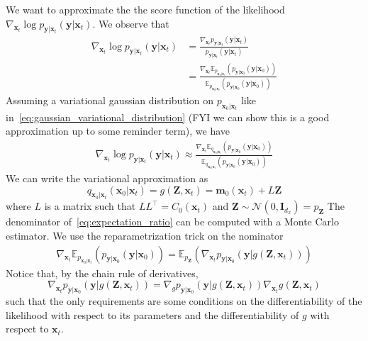 We want to approximate the the score function of the likelihood $\nabla_{\mathbf{x}_t} \log p_{\mathbf{y}|\mathbf{x}_t}(\mathbf{y}|\mathbf{x}_t)$. We observe that
\begin{align}
    \nabla_{\mathbf{x}_t } \log p_{\mathbf{y}|\mathbf{x}_t}(\mathbf{y}|\mathbf{x}_t) &= \frac{\nabla_{\mathbf{x}_t } p_{\mathbf{y}|\mathbf{x}_t}(\mathbf{y}|\mathbf{x}_t)}{p_{\mathbf{y}|\mathbf{x}_t}(\mathbf{y}|\mathbf{x}_t)}\\
    &= \frac{\nabla_{\mathbf{x}_t } \mathbb{E}_{p_{\mathbf{x}_0|\mathbf{x}_t}}(p_{\mathbf{y}|\mathbf{x}_0}(\mathbf{y}|\mathbf{x}_0))}{\mathbb{E}_{p_{\mathbf{x}_0|\mathbf{x}_t}}(p_{\mathbf{y}|\mathbf{x}_0}(\mathbf{y}|\mathbf{x}_0))}
\end{align}
Assuming a variational gaussian distribution on $p_{\mathbf{x}_0|\mathbf{x}_t}$ like in~\eqref{eq:gaussian_variational_distribution} (FYI we can show this is a good approximation up to some reminder term), we have 
\begin{align}
    \nabla_{\mathbf{x}_t } \log p_{\mathbf{y}|\mathbf{x}_t}(\mathbf{y}|\mathbf{x}_t) \approx \frac{\nabla_{\mathbf{x}_t } \mathbb{E}_{q_{\mathbf{x}_0|\mathbf{x}_t}}(p_{\mathbf{y}|\mathbf{x}_0}(\mathbf{y}|\mathbf{x}_0))}{\mathbb{E}_{q_{\mathbf{x}_0|\mathbf{x}_t}}(p_{\mathbf{y}|\mathbf{x}_0}(\mathbf{y}|\mathbf{x}_0))}\label{eq:expectation_ratio}
\end{align}
We can write the variational approximation as
\begin{equation}
    q_{\mathbf{x}_0|\mathbf{x}_t}(\mathbf{x}_0|\mathbf{x}_t) = g(\mathbf{Z}, \mathbf{x}_t) = \mathbf{m}_0(\mathbf{x}_t) + L\mathbf{Z} 
\end{equation}
where $L$ is a matrix such that $LL^\top = C_0(\mathbf{x}_t)$ and $\mathbf{Z} \sim \mathcal{N}(0, \mathbf{I}_{d_x}) = p_{\mathbf{Z}}$
The denominator of~\eqref{eq:expectation_ratio} can be computed with a Monte Carlo estimator. We use the reparametrization trick on the nominator
\begin{align}
     \nabla_{\mathbf{x}_t } \mathbb{E}_{p_{\mathbf{x}_0|\mathbf{x}_t}}(p_{\mathbf{y}|\mathbf{x}_0}(\mathbf{y}|\mathbf{x}_0)) = \mathbb{E}_{p_{\mathbf{Z}}}(\nabla_{\mathbf{x}_t }p_{\mathbf{y}| \mathbf{x}_0 }(\mathbf{y}|g(\mathbf{Z}, \mathbf{x}_t))) 
\end{align}
Notice that, by the chain rule of derivatives,
\begin{equation}
\nabla_{\mathbf{x}_t }p_{\mathbf{y}| \mathbf{x}_0 }(\mathbf{y}|g(\mathbf{Z}, \mathbf{x}_t)) = \nabla_{g}p_{\mathbf{y}| \mathbf{x}_0 }(\mathbf{y}|g(\mathbf{Z}, \mathbf{x}_t)) \nabla_{\mathbf{x}_t }g(\mathbf{Z}, \mathbf{x}_t)
\end{equation}
such that the only requirements are some conditions on the differentiability of the likelihood with respect to its parameters and the differentiability of $g$ with respect to $\mathbf{x}_t$.